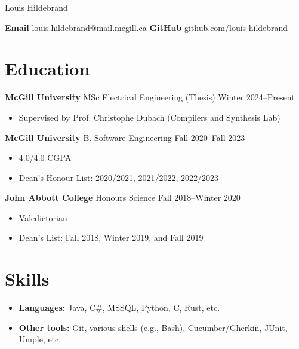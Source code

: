 \documentclass[12pt]{article}
\begin{document}

\pagestyle{empty}

\begin{center}
	\Huge
	Louis Hildebrand
\end{center}
\vspace{0.5\baselineskip}

\textbf{Email}
\href{mailto:louis.hildebrand@mail.mcgill.ca}{louis.hildebrand@mail.mcgill.ca}
\hfill
\textbf{GitHub}
\href{https://github.com/louis-hildebrand}{github.com/louis-hildebrand}

\section*{Education}

\textbf{McGill University} MSc Electrical Engineering (Thesis)
\hfill
Winter 2024--Present
\begin{itemize}
	\item Supervised by Prof. Christophe Dubach (Compilers and Synthesis Lab)
\end{itemize}

\textbf{McGill University} B. Software Engineering
\hfill
Fall 2020--Fall 2023
\begin{itemize}
	\item 4.0/4.0 CGPA
	\item Dean's Honour List: 2020/2021, 2021/2022, 2022/2023
\end{itemize}

\textbf{John Abbott College} Honours Science
\hfill
Fall 2018--Winter 2020
\begin{itemize}
	\item Valedictorian
	\item Dean's List: Fall 2018, Winter 2019, and Fall 2019
\end{itemize}

\section*{Skills}

\begin{itemize}
	\item \textbf{Languages:} Java, C\#, MSSQL, Python, C, Rust, etc.
	\item \textbf{Other tools:} Git, various shells (e.g., Bash), Cucumber/Gherkin, JUnit, Umple, etc.
\end{itemize}
\end{document}
